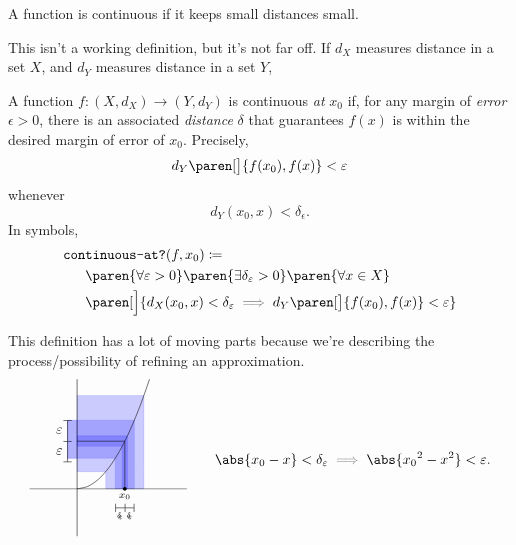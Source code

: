 \documentclass[a5paper]{scrbook}
\let\oldimplies\implies
\def\implies{\color{gray}\oldimplies\color{black}}
\begin{document}
\begin{defn}
  A function is continuous if it keeps small distances small.
\end{defn}
This isn't a working definition, but it's not far off. If \(d_X\) measures distance in a set \(X\), and \(d_Y\) measures distance in a set \(Y\), 
\begin{defn}\label{e-d cont}
  A function \(f:(X,d_X)\to (Y,d_Y)\) is continuous \emph{at} \(x_0\) if, for any margin of \emph{error} \(\epsilon>0\), there is an associated \emph{distance} \(\delta\) that guarantees \(f(x)\) is within the desired margin of error of \(x_0\). Precisely, 
  \[
    d_Y\paren[\big]{f(x_0),f(x)} < \epsilon
  \]
  whenever
  \[
    d_Y(x_0,x) < \delta_\epsilon.
  \]
  In symbols,
  \begin{align*}
    \texttt{con}&\texttt{tinuous-at?}(f,x_0)\define\\
    &\paren{\forall \epsilon >0}\paren{\exists \delta_\epsilon > 0}\paren{\forall x\in X} \\&\paren[\Big]{d_X(x_0,x) < \delta_\epsilon \implies d_Y\paren[\big]{f(x_0),f(x)} < \epsilon}
  \end{align*}
\end{defn}
This definition has a lot of moving parts because we're describing the process/possibility of refining an approximation. 
\[
  \begin{matrix}
    \begin{tikzpicture}[scale=1.2]
      \clip (-1,-1) rectangle (2.3,2.3);
      \def\f#1{{(#1)^2}}
      \def\x{1}
      \def\dx{.2}
      \def\xl{\x-\dx}
      \def\xr{\x+\dx}
      \foreach\dx in {.4, .2, .055}
      \filldraw[color=blue,opacity = .2]
      (\xl,0) -- (\xl,\f{\xl}) -- (0,\f{\xl}) -- (0,\f{\xr})--(\xr,\f{\xr}) -- (\xr,0) -- cycle;
      \draw (\x,0) -- (\x,\f\x) -- (0,\f\x);
      \filldraw[blue, opacity=.3] (0,.64)-- (-.2,.64)--(-.2,\f{1.2}) -- (0,\f{1.2});
      \draw[|-|] (-.2,.56) to[edge label=\(\epsilon\)]  (-.2,1);
      \draw[-|] (-.2,1) to[edge label=\(\epsilon\)] (-.2,1.44);
      \draw[font=\fontsize{7}{7}] (1,-.16) coordinate[label=center:\(x_0\)];
      \fill (1,0) circle (.04);
      \draw[|-] (.8,-.4) to[font=\fontsize{5}{5},edge label'=\(\delta_{\!\!\epsilon}\)] (1,-.4);
      \draw[|-|] (1,-.4) to[font=\fontsize{5}{5},edge label'=\(\delta_{\!\!\epsilon}\)] (1.2,-.4);
      \draw[samples={10},domain=0:2,smooth,variable=\t] plot (\t,\f{\t});
      \draw (-1,0) -- (5,0);
      \draw (0,-1) -- (0,5);
    \end{tikzpicture}
  \end{matrix}
  \qquad
  \abs{x_0 -x} < \delta_\epsilon \implies \abs{x_0{}^2-x^2}< \epsilon.
\]
\end{document}
